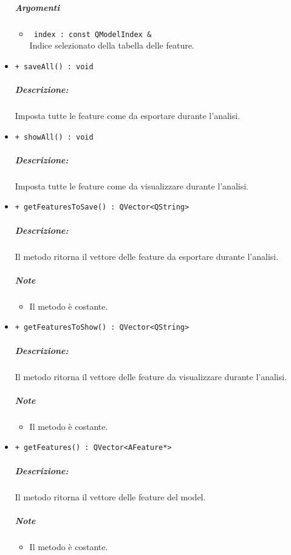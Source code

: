 \begin{itemize}
		\subparagraph{Argomenti}
			\begin{itemize}				
				\item \color{RoyalPurple}\verb! index : const QModelIndex &!\\
				\color{black} Indice selezionato della tabella delle feature\g{}.
			\end{itemize}			
	\item \color{blue}\verb!+ saveAll() : void!\\
		\color{black}
		\subparagraph{Descrizione:} Imposta tutte le feature\g{} come da esportare durante l'analisi.		
	\item \color{blue}\verb!+ showAll() : void!\\
		\color{black}
		\subparagraph{Descrizione:} Imposta tutte le feature\g{} come da visualizzare durante l'analisi.
	\item \color{blue}\verb!+ getFeaturesToSave() : QVector<QString>!\\
			\color{black}
			\subparagraph{Descrizione:} Il metodo ritorna il vettore delle feature\g{} da esportare durante l'analisi.
			\subparagraph{Note}
					\begin{itemize}
						\item Il metodo è costante.
					\end{itemize}					
	\item \color{blue}\verb!+ getFeaturesToShow() : QVector<QString>!\\
			\color{black}
			\subparagraph{Descrizione:} Il metodo ritorna il vettore delle feature\g{} da visualizzare durante l'analisi.
			\subparagraph{Note}
					\begin{itemize}
						\item Il metodo è costante.
					\end{itemize}						
	\item \color{blue}\verb!+ getFeatures() : QVector<AFeature*>!\\
			\color{black}
			\subparagraph{Descrizione:} Il metodo ritorna il vettore delle feature\g{} del model.
			\subparagraph{Note}
					\begin{itemize}
						\item Il metodo è costante.
					\end{itemize}
\end{itemize}
\pagebreak


